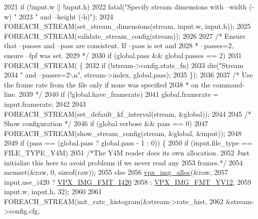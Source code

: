 \begin{DoxyCodeInclude}
{{{{{{{{{{{{{{{{{{{{{{{{{{{{{{{{{{{{{{{{{{{{{{{{{{{{{{{{{{{{{2021     \textcolor{keywordflow}{if} (!input.w || !input.h)
2022       fatal(\textcolor{stringliteral}{"Specify stream dimensions with --width (-w) "}
2023             \textcolor{stringliteral}{" and --height (-h)"});
2024     FOREACH\_STREAM(set\_stream\_dimensions(stream, input.w, input.h));
2025     FOREACH\_STREAM(validate\_stream\_config(stream));
2026 
2027     \textcolor{comment}{/* Ensure that --passes and --pass are consistent. If --pass is set and}
2028 \textcolor{comment}{     * --passes=2, ensure --fpf was set.}
2029 \textcolor{comment}{     */}
2030     \textcolor{keywordflow}{if} (global.pass && global.passes == 2)
2031       FOREACH\_STREAM( \{
2032       \textcolor{keywordflow}{if} (!stream->config.stats\_fn)
2033         die(\textcolor{stringliteral}{"Stream %
2034         \textcolor{stringliteral}{" and --passes=2\(\backslash\)n"}, stream->index, global.pass);
2035     \});
2036 
2037     \textcolor{comment}{/* Use the frame rate from the file only if none was specified}
2038 \textcolor{comment}{     * on the command-line.}
2039 \textcolor{comment}{     */}
2040     \textcolor{keywordflow}{if} (!global.have\_framerate)
2041       global.framerate = input.framerate;
2042 
2043     FOREACH\_STREAM(set\_default\_kf\_interval(stream, &global));
2044 
2045     \textcolor{comment}{/* Show configuration */}
2046     \textcolor{keywordflow}{if} (global.verbose && pass == 0)
2047       FOREACH\_STREAM(show\_stream\_config(stream, &global, &input));
2048 
2049     \textcolor{keywordflow}{if} (pass == (global.pass ? global.pass - 1 : 0)) \{
2050       \textcolor{keywordflow}{if} (input.file\_type == FILE\_TYPE\_Y4M)
2051         \textcolor{comment}{/*The Y4M reader does its own allocation.}
2052 \textcolor{comment}{          Just initialize this here to avoid problems if we never read any}
2053 \textcolor{comment}{           frames.*/}
2054         memset(&raw, 0, \textcolor{keyword}{sizeof}(raw));
2055       \textcolor{keywordflow}{else}
2056         \hyperlink{vpx__image_8h_ab80398f28ca880368a922fa979eb66c1}{vpx\_img\_alloc}(&raw,
2057                       input.use\_i420 ? \hyperlink{vpx__image_8h_a7a30a7bff7400fb83ad45fede5077193af17ce49c9a6efd7c8c8ea8928d4ce26c}{VPX\_IMG\_FMT\_I420}
2058                       : \hyperlink{vpx__image_8h_a7a30a7bff7400fb83ad45fede5077193a6e4e8961bbcf96478c300dc4c3e1dc18}{VPX\_IMG\_FMT\_YV12},
2059                       input.w, input.h, 32);
2060 
2061       FOREACH\_STREAM(init\_rate\_histogram(&stream->rate\_hist,
2062                                          &stream->config.cfg,
}}}}}}}}}}}}}}}}}}}}}}}}}}}}}}}}}}}}}}}}}}}}}}}}}}}}}}}}}}}}}}
\end{DoxyCodeInclude}
